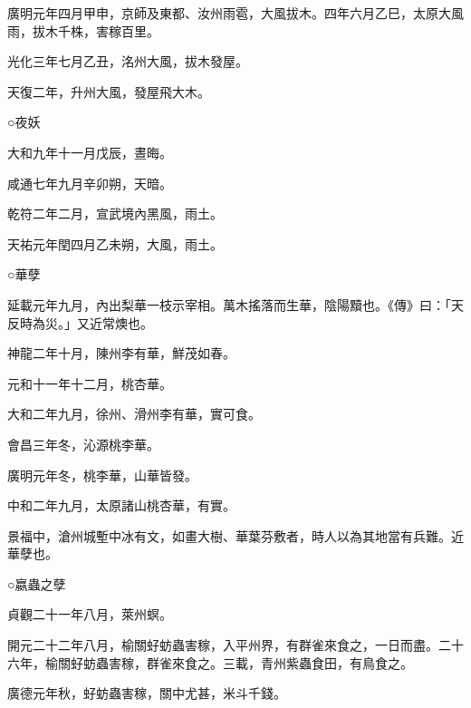 \begin{pinyinscope}
 廣明元年四月甲申，京師及東都、汝州雨雹，大風拔木。四年六月乙巳，太原大風雨，拔木千株，害稼百里。



 光化三年七月乙丑，洺州大風，拔木發屋。



 天復二年，升州大風，發屋飛大木。



 ○夜妖



 大和九年十一月戊辰，晝晦。



 咸通七年九月辛卯朔，天暗。



 乾符二年二月，宣武境內黑風，雨土。



 天祐元年閏四月乙未朔，大風，雨土。



 ○華孽



 延載元年九月，內出梨華一枝示宰相。萬木搖落而生華，陰陽黷也。《傳》曰：「天反時為災。」又近常燠也。



 神龍二年十月，陳州李有華，鮮茂如春。



 元和十一年十二月，桃杏華。



 大和二年九月，徐州、滑州李有華，實可食。



 會昌三年冬，沁源桃李華。



 廣明元年冬，桃李華，山華皆發。



 中和二年九月，太原諸山桃杏華，有實。



 景福中，滄州城塹中冰有文，如畫大樹、華葉芬敷者，時人以為其地當有兵難。近華孽也。



 ○嬴蟲之孽



 貞觀二十一年八月，萊州螟。



 開元二十二年八月，榆關虸蚄蟲害稼，入平州界，有群雀來食之，一日而盡。二十六年，榆關虸蚄蟲害稼，群雀來食之。三載，青州紫蟲食田，有鳥食之。



 廣德元年秋，虸蚄蟲害稼，關中尤甚，米斗千錢。




\end{pinyinscope}
